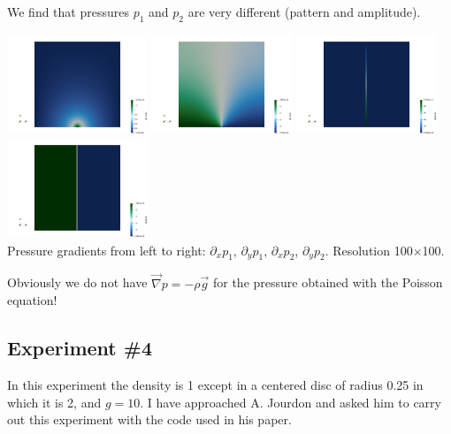 We find that pressures $p_1$ and $p_2$ are very different (pattern and amplitude). 

\begin{center}
\includegraphics[width=4.2cm]{python_codes/fieldstone_119/results/exp3/dp1dx}
\includegraphics[width=4.2cm]{python_codes/fieldstone_119/results/exp3/dp1dy}
\includegraphics[width=4.2cm]{python_codes/fieldstone_119/results/exp3/dp2dx}
\includegraphics[width=4.2cm]{python_codes/fieldstone_119/results/exp3/dp2dy}\\
{\captionfont Pressure gradients from left to right: $\partial_xp_1$, $\partial_yp_1$, $\partial_xp_2$, $\partial_yp_2$. 
Resolution 100$\times$100.}
\end{center}

Obviously we do not have $\vec{\nabla}p=-\rho\vec{g}$ for the pressure obtained with 
the Poisson equation!

\newpage
\subsection*{Experiment \#4}

In this experiment the density is 1 except in a centered disc of radius 0.25 in which it is 2, 
and $g=10$. I have approached A. Jourdon and asked him to carry out this experiment 
with the code used in his paper. 

